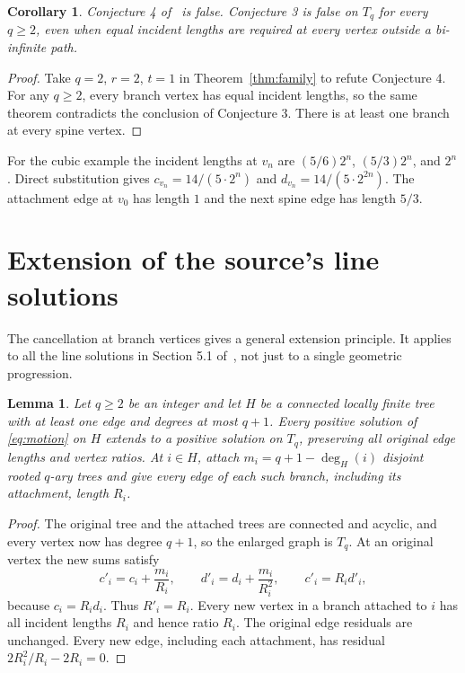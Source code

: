 \documentclass[11pt]{article}
\newtheorem{corollary}[theorem]{Corollary}
\newtheorem{lemma}[theorem]{Lemma}
\begin{document}
\begin{corollary}\label{cor:conjectures}
Conjecture 4 of~\cite{HSXZ} is false. Conjecture 3 is false on $T_q$
for every $q\geq2$, even when equal incident lengths are required at
every vertex outside a bi-infinite path.
\end{corollary}
\begin{proof}
Take $q=2$, $r=2$, $t=1$ in Theorem~\ref{thm:family} to refute
Conjecture 4. For any $q\geq2$, every branch vertex has equal incident
lengths, so the same theorem contradicts the conclusion of Conjecture 3.
There is at least one branch at every spine vertex.
\end{proof}

For the cubic example the incident lengths at $v_n$ are
$(5/6)2^n$, $(5/3)2^n$, and $2^n$. Direct substitution gives
$c_{v_n}=14/(5\cdot2^n)$ and $d_{v_n}=14/(5\cdot2^{2n})$.
The attachment edge at $v_0$ has length $1$ and the next spine edge
has length $5/3$.

\section{Extension of the source's line solutions}
The cancellation at branch vertices gives a general extension principle.
It applies to all the line solutions in Section 5.1 of~\cite{HSXZ},
not just to a single geometric progression.

\begin{lemma}\label{lem:extension}
Let $q\geq2$ be an integer and let $H$ be a connected locally finite tree with at least
one edge and degrees at most $q+1$. Every positive solution of
\eqref{eq:motion} on $H$ extends to a positive solution on $T_q$,
preserving all original edge lengths and vertex ratios. At $i\in H$,
attach $m_i=q+1-\deg_H(i)$ disjoint rooted $q$-ary trees and give every
edge of each such branch, including its attachment, length $R_i$.
\end{lemma}
\begin{proof}
The original tree and the attached trees are connected and acyclic,
and every vertex now has degree $q+1$, so the enlarged graph is $T_q$.
At an original vertex the new sums satisfy
\[
 c'_i=c_i+\frac{m_i}{R_i},\qquad
 d'_i=d_i+\frac{m_i}{R_i^2},\qquad c'_i=R_i d'_i,
\]
because $c_i=R_i d_i$. Thus $R'_i=R_i$. Every new vertex in a branch
attached to $i$ has all incident lengths $R_i$ and hence ratio $R_i$.
The original edge residuals are unchanged. Every new edge, including
each attachment, has residual $2R_i^2/R_i-2R_i=0$.
\end{proof}
\end{document}
